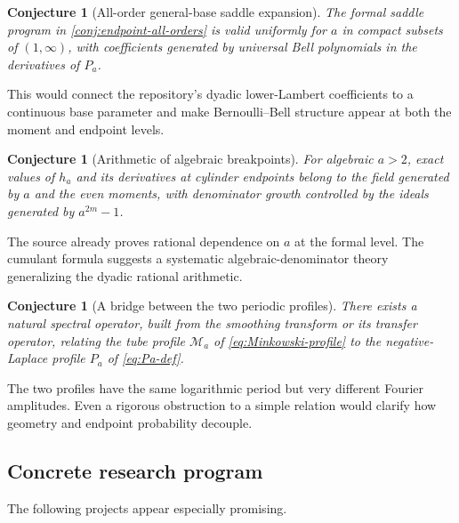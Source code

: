 \documentclass[11pt,oneside]{article}
\newtheorem{conjecture}[theorem]{Conjecture}
\theoremstyle{definition}
\theoremstyle{remark}
\begin{document}
\begin{conjecture}[All-order general-base saddle expansion]
The formal saddle program in \cref{conj:endpoint-all-orders} is valid uniformly for $a$ in
compact subsets of $(1,\infty)$, with coefficients generated by universal Bell polynomials in
the derivatives of $P_a$.
\end{conjecture}
This would connect the repository's dyadic lower-Lambert coefficients to a continuous base
parameter and make Bernoulli--Bell structure appear at both the moment and endpoint levels.

\begin{conjecture}[Arithmetic of algebraic breakpoints]
For algebraic $a>2$, exact values of $h_a$ and its derivatives at cylinder endpoints belong
to the field generated by $a$ and the even moments, with denominator growth controlled by
the ideals generated by $a^{2m}-1$.
\end{conjecture}
The source already proves rational dependence on $a$ at the formal level.  The cumulant
formula suggests a systematic algebraic-denominator theory generalizing the dyadic rational
arithmetic.

\begin{conjecture}[A bridge between the two periodic profiles]
There exists a natural spectral operator, built from the smoothing transform or its transfer
operator, relating the tube profile $\mathcal M_a$ of \eqref{eq:Minkowski-profile} to the
negative-Laplace profile $P_a$ of \eqref{eq:Pa-def}.
\end{conjecture}
The two profiles have the same logarithmic period but very different Fourier amplitudes.
Even a rigorous obstruction to a simple relation would clarify how geometry and endpoint
probability decouple.

\subsection*{Concrete research program}

The following projects appear especially promising.
\end{document}

